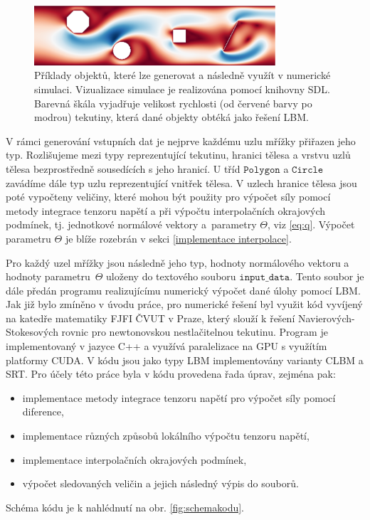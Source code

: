 \begin{figure}[H]
	\centering
	\vspace{2mm}
	\includegraphics[width=0.8\textwidth]{Images/geometrie.png}
	\vspace{3mm}
	\caption{Příklady objektů, které lze generovat a následně využít v numerické simulaci. Vizualizace simulace je realizována pomocí knihovny SDL. Barevná škála vyjadřuje velikost rychlosti (od červené barvy po modrou) tekutiny, která dané objekty obtéká jako řešení LBM.}
	\label{fig:geometrie}
\end{figure}

V rámci generování vstupních dat je nejprve každému uzlu mřížky přiřazen jeho typ. Rozlišujeme mezi typy reprezentující tekutinu, hranici tělesa a vrstvu uzlů tělesa bezprostředně sousedících s jeho hranicí. U tříd $\mathtt{Polygon} $ a $\mathtt{Circle} $ zavádíme dále typ uzlu reprezentující vnitřek tělesa. V uzlech hranice tělesa jsou poté vypočteny veličiny, které mohou být použity pro výpočet síly pomocí metody integrace tenzoru napětí a při výpočtu interpolačních okrajových podmínek, tj. jednotkové normálové vektory a~parametry $ \Theta $, viz \eqref{eq:q}. Výpočet parametru $ \Theta $ je blíže rozebrán v sekci \ref{implementace interpolace}.

Pro každý uzel mřížky jsou následně jeho typ, hodnoty normálového vektoru a hodnoty parametru~$ \Theta $ uloženy do textového souboru $\mathtt{input\_data} $. Tento soubor je dále předán programu realizujícímu numerický výpočet dané úlohy pomocí LBM. Jak již bylo zmíněno v úvodu práce, pro numerické řešení byl využit kód vyvíjený na katedře matematiky FJFI ČVUT v Praze, který slouží k řešení Navierových-Stokesových rovnic pro newtonovskou nestlačitelnou tekutinu. Program je implementovaný v jazyce C++ a využívá paralelizace na GPU s využítím platformy CUDA. V kódu jsou jako typy LBM implementovány varianty CLBM a SRT. Pro účely této práce byla v kódu provedena řada úprav, zejména pak:
\begin{itemize}
	\item implementace metody integrace tenzoru napětí pro výpočet síly pomocí diference,
	\item implementace různých způsobů lokálního výpočtu tenzoru napětí,
	\item implementace interpolačních okrajových podmínek,
	\item výpočet sledovaných veličin a jejich následný výpis do souborů.
\end{itemize}
Schéma kódu je k nahlédnutí na obr. \ref{fig:schemakodu}.

